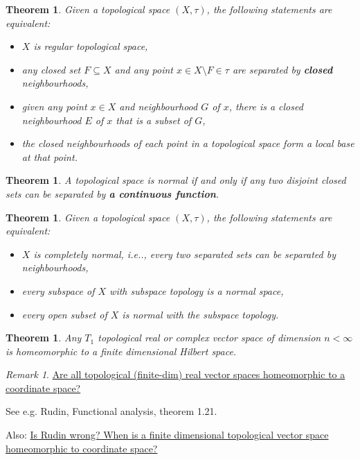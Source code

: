 \documentclass[12pt, letterpaper]{article}
\makeatletter
\newcommand\ie{i.e\@ifnextchar.{}{.\@}}
\newtheorem{thm}[prop]{Theorem}
\theoremstyle{definition}
\theoremstyle{remark}
\newtheorem*{rem*}{Remark}
\theoremstyle{definition}
\theoremstyle{plain}
\numberwithin{equation}{section}
\makeatother
\begin{document}
	\begin{thm}
		Given a topological space $(X,\tau)$, the following statements are equivalent:
		\begin{itemize}
			\item $X$ is regular topological space,
			\item any closed set $F\subseteq X$ and any point $x\in X\setminus F\in\tau$ 
			are separated by \textbf{closed} neighbourhoods,
			\item given any point $x\in X$ and neighbourhood $G$ of $x$, there is a closed neighbourhood $E$ of $x$ that is a subset of $G$,
			\item the closed neighbourhoods of each point in a topological space form a local base at that point.
		\end{itemize}
	\end{thm}
	

	\begin{thm}
		A topological space is normal if and only if any two disjoint closed sets can be separated by \textbf{a continuous function}.
	\end{thm}

	\begin{thm}
		Given a topological space $(X,\tau)$, the following statements are equivalent:
		\begin{itemize}
			\item $X$ is completely normal, \ie, every two separated sets can be separated by neighbourhoods,
			\item every subspace of $X$ with subspace topology is a normal space,
			\item every open subset of $X$ is normal with the subspace topology.
		\end{itemize}
	\end{thm}

	\begin{thm}
		Any $T_1$ topological real or complex vector space of dimension $n<\infty$ is homeomorphic to a finite dimensional
		Hilbert space.
	\end{thm}
	\begin{rem*}
		\href{https://mathoverflow.net/questions/50328/are-all-topological-finite-dim-real-vector-spaces-homeomorphic-to-a-coordinate}
		{Are all topological (finite-dim) real vector spaces homeomorphic to a coordinate space?}
		
		See e.g. Rudin, Functional analysis, theorem 1.21.
		
		Also:
		\href{https://math.stackexchange.com/questions/2763257/is-rudin-wrong-when-is-a-finite-dimensional-topological-vector-space-homeomorph}{Is Rudin wrong? When is a finite dimensional topological vector space homeomorphic to coordinate space?}
	\end{rem*}
	
\end{document}
